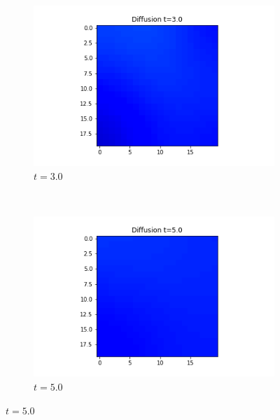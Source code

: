 \documentclass[10pt,a4paper]{article}
\begin{document}
\begin{enumerate}[i)]
\begin{enumerate}[a)]
\begin{figure}[H]
    			\begin{subfigure}[b]{0.25\textwidth}
    				\includegraphics[width= \textwidth]{images/grid-t3-x01.png}
    				\caption{$t=3.0$}
    				\label{gridt3x01}
    			\end{subfigure}~
    			\begin{subfigure}[b]{0.25\textwidth}
    				\includegraphics[width= \textwidth]{images/grid-t5-x01.png}
    				\caption{$t=5.0$}
    				\label{gridt5x01}
    			\end{subfigure}
    			\label{gridx01}
    		\end{figure}
    		

\end{enumerate}
\end{enumerate}
\end{document}
